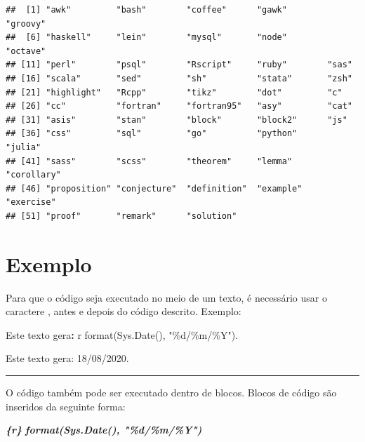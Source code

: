 \documentclass[
]{book}
\newenvironment{Shaded}{\begin{snugshade}}{\end{snugshade}}
\newcommand{\DataTypeTok}[1]{\textcolor[rgb]{0.13,0.29,0.53}{#1}}
\newcommand{\InformationTok}[1]{\textcolor[rgb]{0.56,0.35,0.01}{\textbf{\textit{#1}}}}
\newcommand{\NormalTok}[1]{#1}
\newcommand{\OperatorTok}[1]{\textcolor[rgb]{0.81,0.36,0.00}{\textbf{#1}}}
\newcommand{\StringTok}[1]{\textcolor[rgb]{0.31,0.60,0.02}{#1}}
\begin{document}
\begin{verbatim}
##  [1] "awk"         "bash"        "coffee"      "gawk"        "groovy"     
##  [6] "haskell"     "lein"        "mysql"       "node"        "octave"     
## [11] "perl"        "psql"        "Rscript"     "ruby"        "sas"        
## [16] "scala"       "sed"         "sh"          "stata"       "zsh"        
## [21] "highlight"   "Rcpp"        "tikz"        "dot"         "c"          
## [26] "cc"          "fortran"     "fortran95"   "asy"         "cat"        
## [31] "asis"        "stan"        "block"       "block2"      "js"         
## [36] "css"         "sql"         "go"          "python"      "julia"      
## [41] "sass"        "scss"        "theorem"     "lemma"       "corollary"  
## [46] "proposition" "conjecture"  "definition"  "example"     "exercise"   
## [51] "proof"       "remark"      "solution"
\end{verbatim}

\hypertarget{exemplo}{%
\section{Exemplo}\label{exemplo}}

Para que o código seja executado no meio de um texto, é necessário usar o caractere \texttt{\textasciigrave{}}, antes e depois do código descrito. Exemplo:

\begin{Shaded}
\begin{Highlighting}[]
\NormalTok{Este texto gera}\OperatorTok{:}\StringTok{ \textasciigrave{}}\DataTypeTok{r format(Sys.Date(), "\%d/\%m/\%Y")}\StringTok{\textasciigrave{}}\NormalTok{.}
\end{Highlighting}
\end{Shaded}

Este texto gera: 18/08/2020.

\begin{center}\rule{0.5\linewidth}{0.5pt}\end{center}

O código também pode ser executado dentro de blocos. Blocos de código são inseridos da seguinte forma:

\begin{Shaded}
\begin{Highlighting}[]
\InformationTok{\textasciigrave{}\textasciigrave{}\textasciigrave{}\{r\}}
\InformationTok{format(Sys.Date(), "\%d/\%m/\%Y")}
\InformationTok{\textasciigrave{}\textasciigrave{}\textasciigrave{}}
\end{Highlighting}
\end{Shaded}
\end{document}
